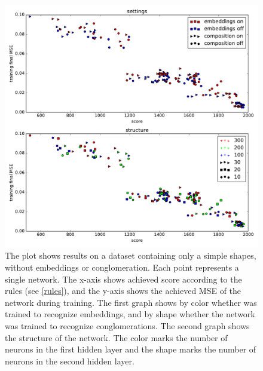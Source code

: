 \begin{figure}
\centering
\includegraphics[width=\linewidth]{ext/figure_simples_cmb.pdf}
\caption{The plot shows results on a dataset containing only a simple shapes, without embeddings or conglomeration. Each point represents a single network. The x-axis shows achieved score according to the rules (see \cref{rules}), and the y-axis shows the achieved MSE of the network during training.
The first graph shows by color whether was trained to recognize embeddings, and by shape whether the network was trained to recognize conglomerations.
The second graph shows the structure of the network. The color marks the number of neurons in the first hidden layer and the shape marks the number of neurons in the second hidden layer.}
\label{fig:simples}
\end{figure}

